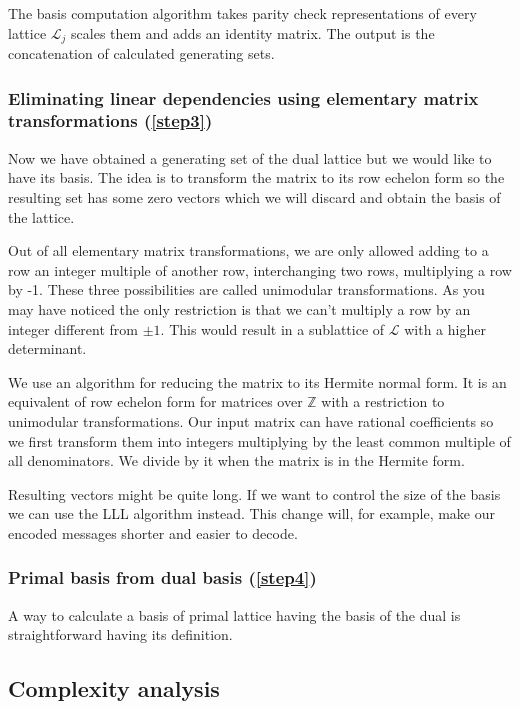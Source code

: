 \documentclass[12pt]{article}
\newcommand{\ZZ}{\mathbb{Z}}
\newcommand{\LL}{\mathcal{L}}
\begin{document}
The basis computation algorithm takes parity check representations of every lattice $\LL_{j}$ scales them and adds an identity matrix. The output is the concatenation of calculated generating sets.

\subsubsection{Eliminating linear dependencies using elementary matrix transformations (\ref{step3})}
\label{subsubsec:hermite_form}
Now we have obtained a generating set of the dual lattice but we would like to have its basis. The idea is to transform the matrix to its row echelon form so the resulting set has some zero vectors which we will discard and obtain the basis of the lattice.

Out of all elementary matrix transformations, we are only allowed adding to a row an integer multiple of another row, interchanging two rows, multiplying a row by -1. These three possibilities are called unimodular transformations. As you may have noticed the only restriction is that we can't multiply a row by an integer different from $\pm 1$. This would result in a sublattice of $\LL$ with a higher determinant.

We use an algorithm for reducing the matrix to its Hermite normal form. It is an equivalent of row echelon form for matrices over $\ZZ$ with a restriction to unimodular transformations. Our input matrix can have rational coefficients so we first transform them into integers multiplying by the least common multiple of all denominators. We divide by it when the matrix is in the Hermite form.

Resulting vectors might be quite long. If we want to control the size of the basis we can use the LLL algorithm instead. This change will, for example, make our encoded messages shorter and easier to decode.

\subsubsection{Primal basis from dual basis (\ref{step4})}
\label{subsubsec:primal_from_dual}
A way to calculate a basis of primal lattice having the basis of the dual is straightforward having its definition.


\subsection{Complexity analysis}
\label{subsec:complexity_integers}
\end{document}
